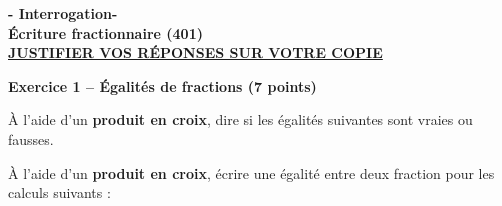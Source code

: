 \documentclass[12pt,a4paper]{exam}
\begin{document}
\begin{center}
\Large \textbf{- Interrogation-\\Écriture fractionnaire (401)}
\vspace{0.5cm}
\\\large \underline{\textbf{JUSTIFIER VOS RÉPONSES SUR VOTRE COPIE}}
\end{center}
\vspace{0.4cm}
\noindent\hrulefill
\vspace{0.5cm}


\textbf{Exercice 1 – Égalités de fractions (7 points)}
\vspace{5pt}

\begin{questions}
    \question[2] À l’aide d’un \textbf{produit en croix}, dire si les égalités suivantes
    sont vraies ou fausses.
    \vspace{5pt}

    \vspace{10pt}

    \question[2] À l’aide d’un \textbf{produit en croix}, écrire une égalité entre deux fraction
    pour les calculs suivants :
    \vspace{5pt}

    \vspace{10pt}


\end{questions}
\end{document}
